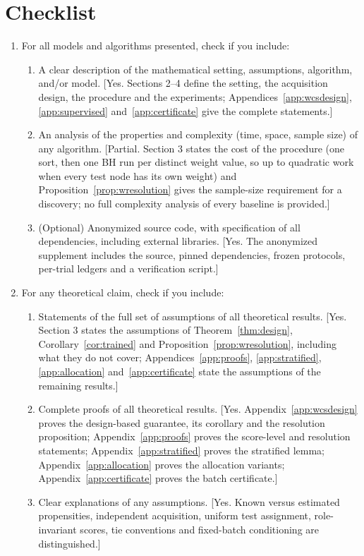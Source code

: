 \section*{Checklist}
\begin{enumerate}

  \item For all models and algorithms presented, check if you include:
  \begin{enumerate}
    \item A clear description of the mathematical setting, assumptions, algorithm, and/or model. [Yes. Sections 2--4 define the setting, the acquisition design, the procedure and the experiments; Appendices~\ref{app:wcsdesign}, \ref{app:supervised} and~\ref{app:certificate} give the complete statements.]
    \item An analysis of the properties and complexity (time, space, sample size) of any algorithm. [Partial. Section 3 states the cost of the procedure (one sort, then one BH run per distinct weight value, so up to quadratic work when every test node has its own weight) and Proposition~\ref{prop:wresolution} gives the sample-size requirement for a discovery; no full complexity analysis of every baseline is provided.]
    \item (Optional) Anonymized source code, with specification of all dependencies, including external libraries. [Yes. The anonymized supplement includes the source, pinned dependencies, frozen protocols, per-trial ledgers and a verification script.]
  \end{enumerate}

  \item For any theoretical claim, check if you include:
  \begin{enumerate}
    \item Statements of the full set of assumptions of all theoretical results. [Yes. Section 3 states the assumptions of Theorem~\ref{thm:design}, Corollary~\ref{cor:trained} and Proposition~\ref{prop:wresolution}, including what they do not cover; Appendices~\ref{app:proofs}, \ref{app:stratified}, \ref{app:allocation} and~\ref{app:certificate} state the assumptions of the remaining results.]
    \item Complete proofs of all theoretical results. [Yes. Appendix~\ref{app:wcsdesign} proves the design-based guarantee, its corollary and the resolution proposition; Appendix~\ref{app:proofs} proves the score-level and resolution statements; Appendix~\ref{app:stratified} proves the stratified lemma; Appendix~\ref{app:allocation} proves the allocation variants; Appendix~\ref{app:certificate} proves the batch certificate.]
    \item Clear explanations of any assumptions. [Yes. Known versus estimated propensities, independent acquisition, uniform test assignment, role-invariant scores, tie conventions and fixed-batch conditioning are distinguished.]
  \end{enumerate}


\end{enumerate}
